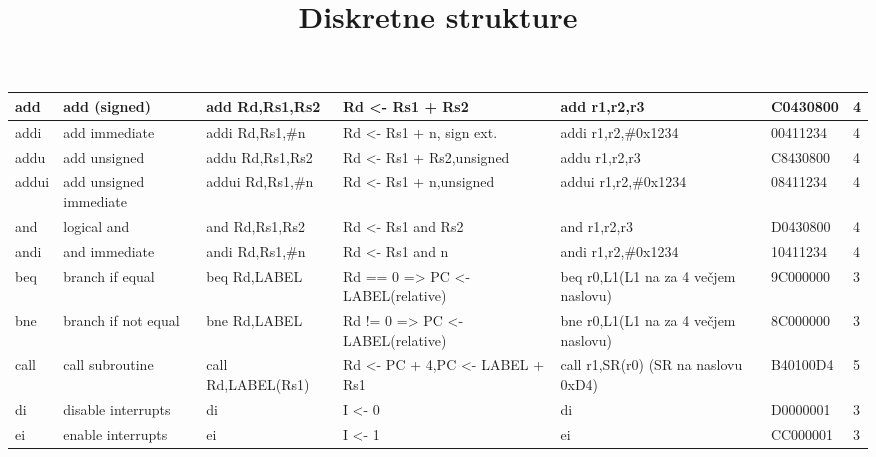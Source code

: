 \documentclass[a4paper,9pt]{extarticle}
\title{Diskretne strukture}
\begin{document}
\raggedright
\footnotesize


{\selectfont
    \begin{tabular}{| p{0.6cm} | p{4cm} | p{3cm} | p{4cm} | p{3cm} | l | l | }
        \hline
        add     & add (signed)                          & add Rd,Rs1,Rs2        & Rd  <- Rs1 + Rs2                      & add r1,r2,r3                          & C0430800  & 4\\ \hline
        addi    & add immediate                         & addi Rd,Rs1,\#n       & Rd <- Rs1 + n, sign ext.              & addi r1,r2,\#0x1234                   & 00411234  & 4\\ \hline
        addu    & add unsigned                          & addu Rd,Rs1,Rs2       & Rd <- Rs1 + Rs2,unsigned              & addu r1,r2,r3                         & C8430800  & 4\\ \hline
        addui   & add unsigned immediate                & addui Rd,Rs1,\#n      & Rd <- Rs1 + n,unsigned                & addui r1,r2,\#0x1234                  & 08411234  & 4\\ \hline
        and     & logical and                           & and Rd,Rs1,Rs2        & Rd <- Rs1 and Rs2                     & and r1,r2,r3                          & D0430800  & 4\\ \hline
        andi    & and immediate                         & andi Rd,Rs1,\#n       & Rd <- Rs1 and n                       & andi r1,r2,\#0x1234                   & 10411234  & 4\\ \hline
        beq     & branch if equal                       & beq Rd,LABEL          &  Rd == 0 => PC <- LABEL(relative)     & beq r0,L1(L1 na za 4 večjem naslovu)  & 9C000000  & 3\\ \hline
        bne     & branch if not equal                   & bne Rd,LABEL          & Rd != 0 => PC <- LABEL(relative)      & bne r0,L1(L1 na za 4 večjem naslovu)  & 8C000000  & 3\\ \hline
        call    & call subroutine                       & call Rd,LABEL(Rs1)    & Rd <- PC + 4,PC <- LABEL + Rs1        & call r1,SR(r0) (SR na naslovu 0xD4)   & B40100D4  & 5\\ \hline
        di      & disable interrupts                    & di                    & I <- 0                                & di                                    & D0000001  & 3\\ \hline
        ei      & enable interrupts                     & ei                    & I <- 1                                & ei                                    & CC000001  & 3\\ \hline

\end{tabular}}
\end{document}
